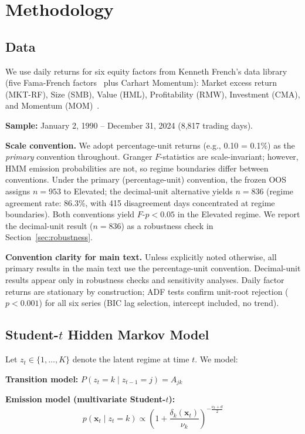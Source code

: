 \documentclass[sigconf,anonymous]{acmart}
\begin{document}
\section{Methodology}

\subsection{Data}

We use daily returns for six equity factors from Kenneth French's data library~\cite{french2024data} (five Fama-French factors~\cite{fama2015five} plus Carhart Momentum):
Market excess return (MKT-RF), Size (SMB), Value (HML), Profitability (RMW),
Investment (CMA), and Momentum (MOM)~\cite{jegadeesh1993returns,carhart1997persistence}.

\textbf{Sample:} January 2, 1990 -- December 31, 2024 (8,817 trading days).

\textbf{Scale convention.} We adopt percentage-unit returns (e.g., 0.10 = 0.1\%) as the \emph{primary} convention throughout.
Granger $F$-statistics are scale-invariant; however, HMM emission probabilities are not,
so regime boundaries differ between conventions. Under the primary (percentage-unit) convention,
the frozen OOS assigns $n = 953$ to Elevated; the decimal-unit alternative yields $n = 836$
(regime agreement rate: 86.3\%, with 415 disagreement days concentrated at regime boundaries).
Both conventions yield $F$-$p < 0.05$ in the Elevated regime.
We report the decimal-unit result ($n = 836$) as a robustness check in Section~\ref{sec:robustness}.

\textbf{Convention clarity for main text.} Unless explicitly noted otherwise, all primary results in the main text use the percentage-unit convention. Decimal-unit results appear only in robustness checks and sensitivity analyses.
Daily factor returns are stationary by construction; ADF tests confirm unit-root
rejection ($p < 0.001$) for all six series (BIC lag selection, intercept included,
no trend).

\subsection{Student-\texorpdfstring{$t$}{t} Hidden Markov Model}
\label{sec:hmm}

Let $z_t \in \{1, \ldots, K\}$ denote the latent regime at time $t$. We model:

\textbf{Transition model:}
$P(z_t = k \mid z_{t-1} = j) = A_{jk}$

\textbf{Emission model (multivariate Student-$t$):}
\begin{equation}
p(\mathbf{x}_t \mid z_t = k) \propto \left(1 + \frac{\delta_k(\mathbf{x}_t)}{\nu_k}\right)^{-\frac{\nu_k+d}{2}}
\end{equation}
\end{document}
